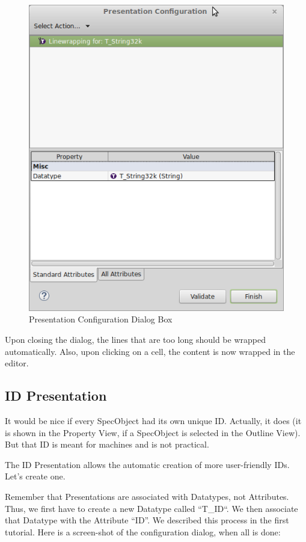 \begin{figure}[H]
\centering
\includegraphics[width=0.8\linewidth]{../rmf-images/presentationconfig.png}      
\caption{Presentation Configuration Dialog Box}      
\label{fig:presentationConfig}
\end{figure}

Upon closing the dialog, the lines that are too long should be wrapped automatically.  Also, upon clicking on a cell, the content is now wrapped in the editor.

\subsection{ID Presentation}

It would be nice if every SpecObject had its own unique ID.  Actually, it does (it is shown in the Property View, if a SpecObject is selected in
the Outline View).  But that ID is meant for machines and is not practical.

The ID Presentation allows the automatic creation of more user-friendly IDs.  Let's create one.

Remember that Presentations are associated with Datatypes, not Attributes.  Thus, we first have to create a new Datatype called ``T\_ID``.  We then associate that Datatype with the Attribute ``ID''.  We described this process in the first tutorial.  Here is a screen-shot of the configuration dialog, when all is done:

